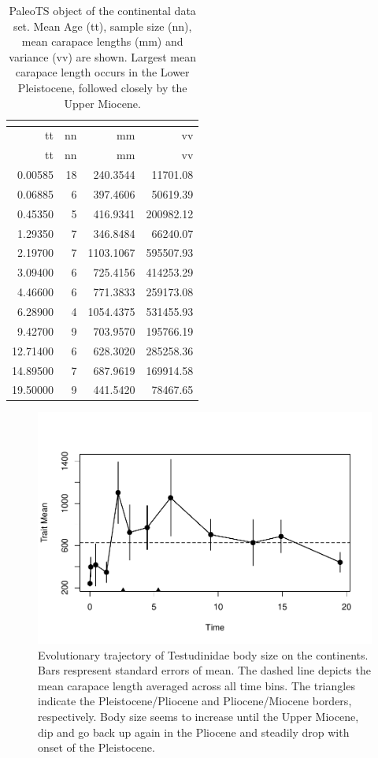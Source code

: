 \begin{longtable}[H]{@{}rrrr@{}}
	\caption[PaleoTS object of continental \T]{PaleoTS object of the continental data set. Mean Age (tt), sample size (nn), mean carapace lengths (mm) and variance (vv) are shown. Largest mean carapace length occurs in the Lower Pleistocene, followed closely by the Upper Miocene.}
	\label{tab:pTSC}\tabularnewline
	\toprule
	tt & nn & mm & vv\tabularnewline
	\midrule
	\endfirsthead
	\toprule
	tt & nn & mm & vv\tabularnewline
	\midrule
	\endhead
	0.00585 & 18 & 240.3544 & 11701.08\tabularnewline
	0.06885 & 6 & 397.4606 & 50619.39\tabularnewline
	0.45350 & 5 & 416.9341 & 200982.12\tabularnewline
	1.29350 & 7 & 346.8484 & 66240.07\tabularnewline
	2.19700 & 7 & 1103.1067 & 595507.93\tabularnewline
	3.09400 & 6 & 725.4156 & 414253.29\tabularnewline
	4.46600 & 6 & 771.3833 & 259173.08\tabularnewline
	6.28900 & 4 & 1054.4375 & 531455.93\tabularnewline
	9.42700 & 9 & 703.9570 & 195766.19\tabularnewline
	12.71400 & 6 & 628.3020 & 285258.36\tabularnewline
	14.89500 & 7 & 687.9619 & 169914.58\tabularnewline
	19.50000 & 9 & 441.5420 & 78467.65\tabularnewline
	\bottomrule
\end{longtable}

\begin{figure}[H]
	\centering
	\includegraphics{MA_JJ_files/figure-latex/paleoTSC-1.pdf}
	\caption[PaleoTS plot of continental data set]{Evolutionary trajectory of Testudinidae body size on the continents. Bars respresent standard errors of mean. The dashed line depicts the mean carapace length averaged across all time bins. The triangles indicate the Pleistocene/Pliocene and Pliocene/Miocene borders, respectively. Body size seems to increase until the Upper Miocene, dip and go back up again in the Pliocene and steadily drop with onset of the Pleistocene.
	}
	\label{fig:pTSC}
\end{figure}

